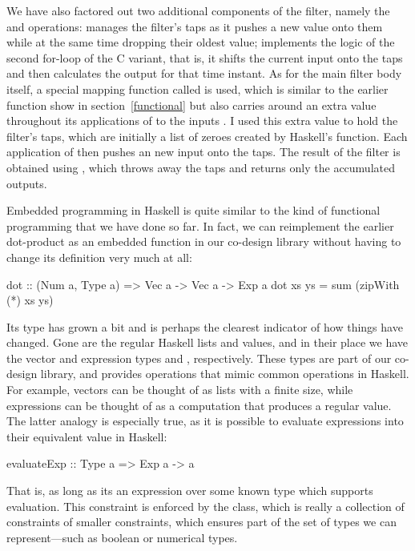 \noindent We have also factored out two additional components of the filter, namely the  and  operations:  manages the filter's taps as it pushes a new value onto them while at the same time dropping their oldest value;  implements the logic of the second for-loop of the C variant, that is, it shifts the current input onto the taps and then calculates the output for that time instant. As for the main filter body itself, a special mapping function called  is used, which is similar to the earlier  function show in section~\ref{functional} but also carries around an extra value throughout its applications of  to the inputs . I used this extra value to hold the filter's taps, which are initially a list of zeroes created by Haskell's  function. Each application of  then pushes an new input onto the taps. The result of the filter is obtained using , which throws away the taps and returns only the accumulated outputs.

Embedded programming in Haskell is quite similar to the kind of functional programming that we have done so far. In fact, we can reimplement the earlier dot-product as an embedded function in our co-design library without having to change its definition very much at all:

\begin{code}
dot :: (Num a, Type a) => Vec a -> Vec a -> Exp a
dot xs ys = sum (zipWith (*) xs ys)
\end{code}

\noindent Its type has grown a bit and is perhaps the clearest indicator of how things have changed. Gone are the regular Haskell lists and values, and in their place we have the vector and expression types  and , respectively. These types are part of our co-design library, and provides operations that mimic common operations in Haskell. For example, vectors can be thought of as lists with a finite size, while expressions can be thought of as a computation that produces a regular value. The latter analogy is especially true, as it is possible to evaluate expressions into their equivalent value in Haskell:

\begin{code}
evaluateExp :: Type a => Exp a -> a
\end{code}

\noindent That is, as long as its an expression over some known type  which supports evaluation. This constraint is enforced by the  class, which is really a collection of constraints of smaller constraints, which ensures  part of the set of types we can represent---such as boolean or numerical types.

